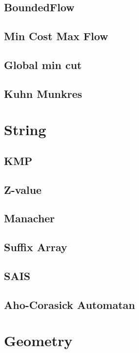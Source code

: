 \subsection{BoundedFlow}

\subsection{Min Cost Max Flow}

\subsection{Global min cut}

\subsection{Kuhn Munkres}


\section{String}
\subsection{KMP}

\subsection{Z-value}

\subsection{Manacher}

\subsection{Suffix Array}

\subsection{SAIS}

\subsection{Aho-Corasick Automatan}


\section{Geometry}
